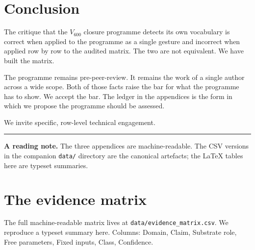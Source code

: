 \documentclass[11pt,a4paper]{article}
\begin{document}
\section{Conclusion}
\label{sec:conclusion}

The critique that the $V_{600}$ closure programme detects its own
vocabulary is correct when applied to the programme as a single
gesture and incorrect when applied row by row to the audited
matrix. The two are not equivalent. We have built the matrix.

The programme remains pre-peer-review. It remains the work of a
single author across a wide scope. Both of those facts raise the
bar for what the programme has to show. We accept the bar. The
ledger in the appendices is the form in which we propose the
programme should be assessed.

We invite specific, row-level technical engagement.

\bigskip

\hrule
\bigskip

\noindent\textbf{A reading note.} The three appendices are
machine-readable. The CSV versions in the companion
\texttt{data/} directory are the canonical artefacts; the LaTeX
tables here are typeset summaries.

\appendix

\section{The evidence matrix}
\label{app:matrix}

The full machine-readable matrix lives at
\texttt{data/evidence\_matrix.csv}. We reproduce a typeset summary
here. Columns: Domain, Claim, Substrate role, Free parameters,
Fixed inputs, Class, Confidence.
\end{document}
